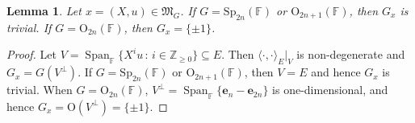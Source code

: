 \documentclass[12pt]{amsart}
\newtheorem{lm}{Lemma}[section]
\theoremstyle{definition}
\theoremstyle{remark}\newtheorem{rmk}[lm]{Remark}
\newcommand{\RO}{{\mathrm {O}}}
\newcommand{\Sp}{{\mathrm{Sp}}}
\newcommand{\Span}{\operatorname{Span}}
\newcommand{\fM}{\mathfrak M}
\newcommand{\fN}{\mathfrak N}
\newcommand{\Z}{\mathbb{Z}}
\newcommand{\C}{\mathbb{F}}
\newcommand{\be}{\mathbf{e}}
\renewcommand{\mid}{\,:\,}
\begin{document}
	
	\begin{lm}
		\label{lm:stabilizermaximal}
		Let $x=(X,u)\in\fM_G$. If $G=\Sp_{2n}(\C)$ or $\RO_{2n+1}(\C)$, then $G_x$ is trivial. If $G=\RO_{2n}(\C)$, then $G_x=\{\pm 1\}$.
	\end{lm}
	\begin{proof}
		Let $V=\Span_{\C}\{X^iu\mid i\in\Z_{\geq 0}\}\subseteq E$. Then $\langle\cdot,\cdot\rangle_E|_V$ is non-degenerate and $G_x=G(V^{\bot})$. If $G=\Sp_{2n}(\C)$ or $\RO_{2n+1}(\C)$, then $V=E$ and hence $G_x$ is trivial. When $G=\RO_{2n}(\C)$, $V^{\bot}=\Span_{\C}\{\be_n-\be_{2n}\}$ is one-dimensional, and hence $G_x=\RO(V^{\bot})=\{\pm 1\}$.
	\end{proof}
	
\end{document}
